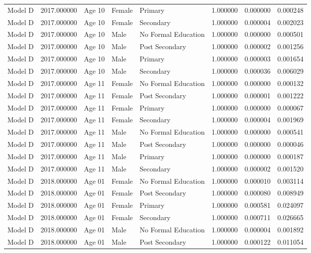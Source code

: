 \begin{table}[ht]
\begin{tabular}{lrlllrrr}
Model D & 2017.000000 & Age 10 & Female & Primary & 1.000000 & 0.000000 & 0.000248 \\
Model D & 2017.000000 & Age 10 & Female & Secondary & 1.000000 & 0.000004 & 0.002023 \\
Model D & 2017.000000 & Age 10 & Male & No Formal Education & 1.000000 & 0.000000 & 0.000501 \\
Model D & 2017.000000 & Age 10 & Male & Post Secondary & 1.000000 & 0.000002 & 0.001256 \\
Model D & 2017.000000 & Age 10 & Male & Primary & 1.000000 & 0.000003 & 0.001654 \\
Model D & 2017.000000 & Age 10 & Male & Secondary & 1.000000 & 0.000036 & 0.006029 \\
Model D & 2017.000000 & Age 11 & Female & No Formal Education & 1.000000 & 0.000000 & 0.000132 \\
Model D & 2017.000000 & Age 11 & Female & Post Secondary & 1.000000 & 0.000001 & 0.001222 \\
Model D & 2017.000000 & Age 11 & Female & Primary & 1.000000 & 0.000000 & 0.000067 \\
Model D & 2017.000000 & Age 11 & Female & Secondary & 1.000000 & 0.000004 & 0.001969 \\
Model D & 2017.000000 & Age 11 & Male & No Formal Education & 1.000000 & 0.000000 & 0.000541 \\
Model D & 2017.000000 & Age 11 & Male & Post Secondary & 1.000000 & 0.000000 & 0.000046 \\
Model D & 2017.000000 & Age 11 & Male & Primary & 1.000000 & 0.000000 & 0.000187 \\
Model D & 2017.000000 & Age 11 & Male & Secondary & 1.000000 & 0.000002 & 0.001520 \\
Model D & 2018.000000 & Age 01 & Female & No Formal Education & 1.000000 & 0.000010 & 0.003114 \\
Model D & 2018.000000 & Age 01 & Female & Post Secondary & 1.000000 & 0.000080 & 0.008949 \\
Model D & 2018.000000 & Age 01 & Female & Primary & 1.000000 & 0.000581 & 0.024097 \\
Model D & 2018.000000 & Age 01 & Female & Secondary & 1.000000 & 0.000711 & 0.026665 \\
Model D & 2018.000000 & Age 01 & Male & No Formal Education & 1.000000 & 0.000004 & 0.001892 \\
Model D & 2018.000000 & Age 01 & Male & Post Secondary & 1.000000 & 0.000122 & 0.011054 \\

\end{tabular}
\end{table}
